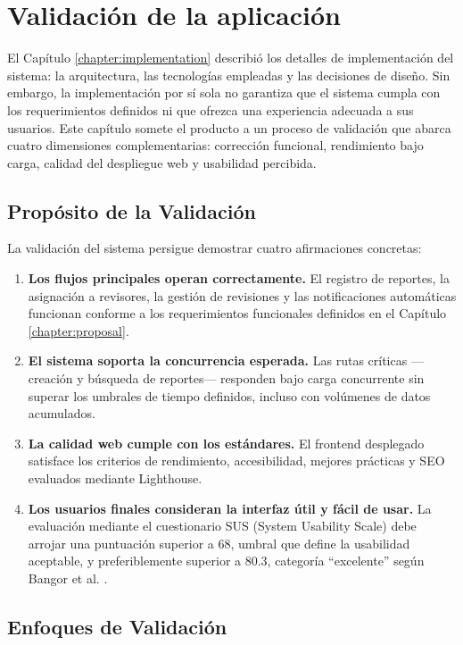 \chapter{Validación de la aplicación}\label{chapter:result}

El Capítulo \ref{chapter:implementation} describió los detalles de implementación del sistema: la arquitectura, las tecnologías empleadas y las decisiones de diseño. 
Sin embargo, la implementación por sí sola no garantiza que el sistema cumpla con los requerimientos definidos ni que ofrezca una experiencia adecuada a sus usuarios. 
Este capítulo somete el producto a un proceso de validación que abarca cuatro dimensiones complementarias: corrección funcional, rendimiento bajo carga, calidad del despliegue web y usabilidad percibida.


\section{Propósito de la Validación}

La validación del sistema persigue demostrar cuatro afirmaciones concretas:

\begin{enumerate}
    \item \textbf{Los flujos principales operan correctamente.} El registro de reportes, la asignación a revisores, la gestión de revisiones y las notificaciones automáticas funcionan conforme a los requerimientos funcionales definidos en el Capítulo \ref{chapter:proposal}.
    \item \textbf{El sistema soporta la concurrencia esperada.} Las rutas críticas —creación y búsqueda de reportes— responden bajo carga concurrente sin superar los umbrales de tiempo definidos, incluso con volúmenes de datos acumulados.
    \item \textbf{La calidad web cumple con los estándares.} El frontend desplegado satisface los criterios de rendimiento, accesibilidad, mejores prácticas y SEO evaluados mediante Lighthouse.
    \item \textbf{Los usuarios finales consideran la interfaz útil y fácil de usar.} La evaluación mediante el cuestionario SUS (System Usability Scale) debe arrojar una puntuación superior a 68, umbral que define la usabilidad aceptable, y preferiblemente superior a 80.3, categoría ``excelente'' según Bangor et al. \cite{bangor2009}.
\end{enumerate}

\section{Enfoques de Validación}

